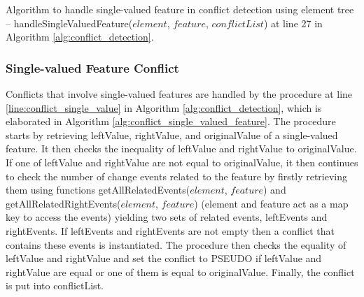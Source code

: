 \IncMargin{1.5em}
\begin{algorithm*}[]
  \caption{Algorithm to handle single-valued feature in conflict detection using element tree -- handleSingleValuedFeature($element$, $feature$, $conflictList$) at line 27 in Algorithm \ref{alg:conflict_detection}.}
  \label{alg:conflict_single_valued_feature}
\end{algorithm*}
\DecMargin{1.5em}

\subsubsection{Single-valued Feature Conflict} 
\label{sec:single_valued_conflict}
Conflicts that involve single-valued features are handled by the procedure at line \ref{line:conflict_single_value} in Algorithm \ref{alg:conflict_detection}, which is elaborated in Algorithm \ref{alg:conflict_single_valued_feature}. The procedure starts by retrieving \textsf{leftValue}, \textsf{rightValue}, and \textsf{originalValue} of a single-valued feature. It then checks the inequality of \textsf{leftValue} and \textsf{rightValue} to \textsf{originalValue}. If one of \textsf{leftValue} and \textsf{rightValue} are not equal to \textsf{originalValue}, it then continues to check the number of change events related to the feature by firstly retrieving them using functions \textsf{getAllRelatedEvents($element$, $feature$)} and \textsf{getAllRelatedRightEvents($element$, $feature$)} (element and feature act as a map key to access the events) yielding two sets of related events, \textsf{leftEvents} and \textsf{rightEvents}. If \textsf{leftEvents} and \textsf{rightEvents} are not empty then a conflict that contains these events is instantiated. The procedure then checks the equality of \textsf{leftValue} and \textsf{rightValue} and set the conflict to \textsf{PSEUDO} if \textsf{leftValue} and \textsf{rightValue} are equal or one of them is equal to \textsf{originalValue}. Finally, the conflict is put into \textsf{conflictList}. 

